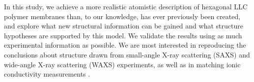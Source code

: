 
  In this study, we achieve a more realistic atomistic description of
  hexagonal LLC polymer membranes than, to our knowledge, has ever previously
  been created, and explore what new structural information can be gained and
  what structure hypotheses are supported by this model. We validate the results
  using as much experimental information as possible. We are most interested in
  reproducing the conclusions about structure drawn from small-angle X-ray
  scattering (SAXS) and wide-angle X-ray scattering (WAXS) experiments, as well
  as in matching ionic conductivity measurements \cite{feng_thin_2016}.

